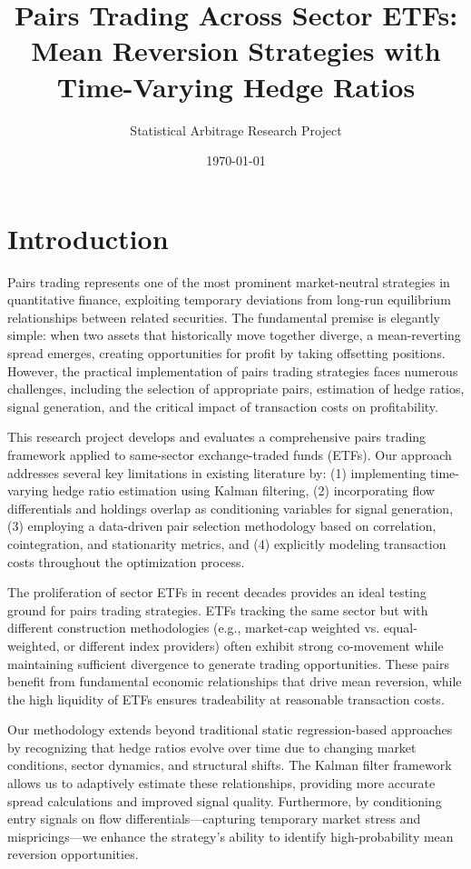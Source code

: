 \documentclass[12pt]{article}
\title{Pairs Trading Across Sector ETFs: Mean Reversion Strategies with Time-Varying Hedge Ratios}
\author{Statistical Arbitrage Research Project}
\date{\today}
\begin{document}
\maketitle

\section{Introduction}

Pairs trading represents one of the most prominent market-neutral strategies in quantitative finance, exploiting temporary deviations from long-run equilibrium relationships between related securities. The fundamental premise is elegantly simple: when two assets that historically move together diverge, a mean-reverting spread emerges, creating opportunities for profit by taking offsetting positions. However, the practical implementation of pairs trading strategies faces numerous challenges, including the selection of appropriate pairs, estimation of hedge ratios, signal generation, and the critical impact of transaction costs on profitability.

This research project develops and evaluates a comprehensive pairs trading framework applied to same-sector exchange-traded funds (ETFs). Our approach addresses several key limitations in existing literature by: (1) implementing time-varying hedge ratio estimation using Kalman filtering, (2) incorporating flow differentials and holdings overlap as conditioning variables for signal generation, (3) employing a data-driven pair selection methodology based on correlation, cointegration, and stationarity metrics, and (4) explicitly modeling transaction costs throughout the optimization process.

The proliferation of sector ETFs in recent decades provides an ideal testing ground for pairs trading strategies. ETFs tracking the same sector but with different construction methodologies (e.g., market-cap weighted vs. equal-weighted, or different index providers) often exhibit strong co-movement while maintaining sufficient divergence to generate trading opportunities. These pairs benefit from fundamental economic relationships that drive mean reversion, while the high liquidity of ETFs ensures tradeability at reasonable transaction costs.

Our methodology extends beyond traditional static regression-based approaches by recognizing that hedge ratios evolve over time due to changing market conditions, sector dynamics, and structural shifts. The Kalman filter framework allows us to adaptively estimate these relationships, providing more accurate spread calculations and improved signal quality. Furthermore, by conditioning entry signals on flow differentials—capturing temporary market stress and mispricings—we enhance the strategy's ability to identify high-probability mean reversion opportunities.
\end{document}
